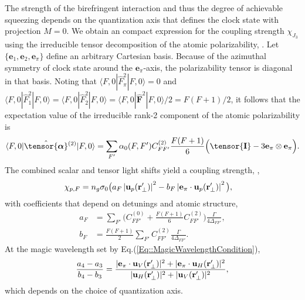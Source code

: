\documentclass[preprint, aps,pra,onecolumn]{revtex4-1} %
\newcommand{\unittens}{\tensor{\mathbf{I}}}
\newcommand{\poltens}{\hat{\tensor{\boldsymbol{\alpha}}}}
\newcommand{\qaxis}{\mathbf{e}_\pi}
\newcommand{\chieff}{\chi_{J_3}}
\begin{document}
The strength of the birefringent interaction and thus the degree of achievable squeezing depends on the quantization axis that defines the clock state with projection $M=0$.  We obtain an compact expression for the coupling strength $\chieff$ using the irreducible tensor decomposition of the atomic polarizability, .  
Let $\{\mathbf{e}_1,\mathbf{e}_2, \mathbf{e}_\pi\}$ define an arbitrary Cartesian basis.  Because of the azimuthal symmetry of clock state around the $\qaxis$-axis, the polarizability tensor is diagonal in that basis.  
Noting that $\langle F,0 | \hat{F}_{\pi}^2| F,0 \rangle =0$ and $\langle F,0 | \hat{F}_{1}^2| F,0 \rangle = \langle F,0 | \hat{F}_{2}^2| F,0 \rangle = \langle F,0 | \hat{\mathbf{F}}^2| F,0 \rangle /2 =F(F+1)/2$, it follows that the expectation value of the irreducible rank-2 component of the atomic polarizability is
	\begin{align} \label{Eq::CouplingAngleMagic}
		\langle F,0 | \poltens \phantom{}^{(2)}| F,0 \rangle = \sum_{F'} \alpha_0(F,F') C^{(2)}_{FF'} \frac{F(F+1)}{6} \Big( \unittens - 3\qaxis \otimes \qaxis \Big).
	\end{align}
The combined scalar and tensor light shifts yield a coupling strength, ,
	\begin{align}
		\chi_{p,F} &  = n_g \sigma_0 \big(  a_{F} \left|\mathbf{u}_p(\mathbf{r}'_\perp)\right|^2 - b_{F} \left|\mathbf{e}_\pi \cdot \mathbf{u}_p(\mathbf{r}'_\perp)\right|^2 \big), \label{Eq::ClockStateCoupling}
	\end{align}
with coefficients that depend on detunings and atomic structure,
	\begin{align}
		a_F &= \sum_{F'}  \Big(C^{(0)}_{FF'} + \frac{F(F+1)}{6} C^{(2)}_{FF'} \Big) \frac{\Gamma}{4 \Delta_{FF'}},\\
		b_F &= \frac{F(F+1)}{2}\sum_{F'} C^{(2)}_{FF'}  \frac{\Gamma}{4 \Delta_{FF'}}.
	\end{align}
At the magic wavelength set by Eq.(\ref{Eq::MagicWavelengthCondition}),
\begin{equation}
	\frac{a_4-a_3}{b_4-b_3} =  \frac{ |\mathbf{e}_\pi \cdot \mathbf{u}_V(\mathbf{r}'_\perp)|^2  + |\mathbf{e}_\pi \cdot \mathbf{u}_H(\mathbf{r}'_\perp) |^2 }{ |\mathbf{u}_H(\mathbf{r}'_\perp)|^2 + |\mathbf{u}_V(\mathbf{r}'_\perp)|^2 },
\end{equation}
which depends on the choice of quantization axis.
\end{document}
